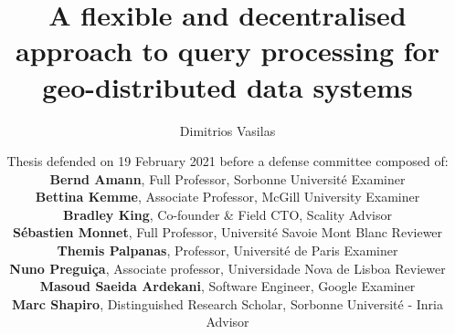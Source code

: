\documentclass[aspectratio=169]{beamer}
\title{A flexible and decentralised approach to query processing for geo-distributed data systems}
\author{\normalsize Dimitrios Vasilas}
\date{\scriptsize{Thesis defended on 19 February 2021 before a defense committee composed of: \\ \medskip
\textbf{Bernd Amann}, Full Professor, Sorbonne Universit{\'e}  \hfill Examiner \\
\textbf{Bettina Kemme}, Associate Professor, McGill University \hfill Examiner \\
\textbf{Bradley King}, Co-founder \& Field CTO, Scality \hfill Advisor \\
\textbf{S{\'e}bastien Monnet}, Full Professor, Universit{\'e} Savoie Mont Blanc \hfill Reviewer \\
\textbf{Themis Palpanas}, Professor, Universit\'{e} de Paris \hfill Examiner \\
\textbf{Nuno Pregui\c{c}a}, Associate professor, Universidade Nova de Lisboa \hfill Reviewer \\
\textbf{Masoud Saeida Ardekani}, Software Engineer, Google \hfill Examiner \\
\textbf{Marc Shapiro}, Distinguished Research Scholar, Sorbonne Universit{\'e} - Inria \hfill Advisor \\
}
}
\begin{document}
\begin{frame}[plain]
\vspace{-1cm}
\titlepage
\end{frame}




\end{document}
